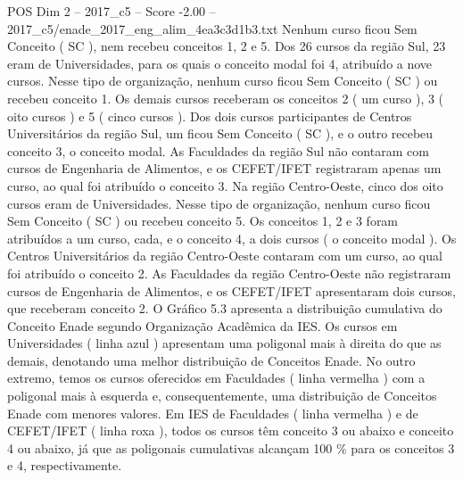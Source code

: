 \begin{textsample}{POS Dim 2 – 2017\_c5 – Score -2.00 – 2017\_c5/enade\_2017\_eng\_alim\_4ea3c3d1b3.txt}
Nenhum curso ficou Sem Conceito ( SC ), nem recebeu conceitos 1, 2 e 5.
Dos 26 cursos da região Sul, 23 eram de Universidades, para os quais o conceito modal foi 4, atribuído a nove cursos.
Nesse tipo de organização, nenhum curso ficou Sem Conceito ( SC ) ou recebeu conceito 1.
Os demais cursos receberam os conceitos 2 ( um curso ), 3 ( oito cursos ) e 5 ( cinco cursos ).
Dos dois cursos participantes de Centros Universitários da região Sul, um ficou Sem Conceito ( SC ), e o outro recebeu conceito 3, o conceito modal.
As Faculdades da região Sul não contaram com cursos de Engenharia de Alimentos, e os CEFET/IFET registraram apenas um curso, ao qual foi atribuído o conceito 3.
Na região Centro-Oeste, cinco dos oito cursos eram de Universidades.
Nesse tipo de organização, nenhum curso ficou Sem Conceito ( SC ) ou recebeu conceito 5.
Os conceitos 1, 2 e 3 foram atribuídos a um curso, cada, e o conceito 4, a dois cursos ( o conceito modal ).
Os Centros Universitários da região Centro-Oeste contaram com um curso, ao qual foi atribuído o conceito 2.
As Faculdades da região Centro-Oeste não registraram cursos de Engenharia de Alimentos, e os CEFET/IFET apresentaram dois cursos, que receberam conceito 2.
O Gráfico 5.3 apresenta a distribuição cumulativa do Conceito Enade segundo Organização Acadêmica da IES.
Os cursos em Universidades ( linha azul ) apresentam uma poligonal mais à direita do que as demais, denotando uma melhor distribuição de Conceitos Enade.
No outro extremo, temos os cursos oferecidos em Faculdades ( linha vermelha ) com a poligonal mais à esquerda e, consequentemente, uma distribuição de Conceitos Enade com menores valores.
Em IES de Faculdades ( linha vermelha ) e de CEFET/IFET ( linha roxa ), todos os cursos têm conceito 3 ou abaixo e conceito 4 ou abaixo, já que as poligonais cumulativas alcançam 100 \% para os conceitos 3 e 4, respectivamente.

\end{textsample}

